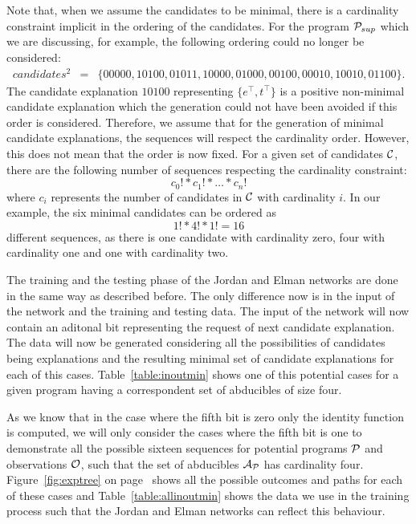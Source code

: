 Note that, when we assume the candidates to be minimal, there is a cardinality constraint implicit in the ordering of the candidates. For the program $\mathcal{P}_{sup}$ which we are discussing, for example, the following ordering could no longer be considered: 
\[
\begin{array}{lcl}
candidates^2 &=& \{00000, 10100, 01011, 10000, 01000, 00100, 00010, 10010, 01100\}.
\end{array}
\]
The candidate explanation $10100$ representing $\{e^\top, t^\top\}$ is a positive non-minimal candidate explanation which the generation could not have been avoided if this order is considered. Therefore, we assume that for the generation of minimal candidate explanations, the sequences will respect the cardinality order. However, this does not mean that the order is now fixed. For a given set of candidates $\mathcal{C}$, there are the following number of sequences respecting the cardinality constraint:
\[
c_0! * c_1! * \dots * c_n!
\]
where $c_i$ represents the number of candidates in $\mathcal{C}$ with cardinality $i$. In our example, the six minimal candidates can be ordered as
\[
1!*4!*1! = 16
\]
different sequences, as there is one candidate with cardinality zero, four with cardinality one and one with cardinality two.

The training and the testing phase of the Jordan and Elman networks are done in the same way as described before. The only difference now is in the input of the network and the training and testing data. The input of the network will now contain an aditonal bit representing the request of next candidate explanation. The data will now be generated considering all the possibilities of candidates being explanations and the resulting minimal set of candidate explanations for each of this cases. Table~\ref{table:inoutmin} shows one of this potential cases for a given program having a correspondent set of abducibles of size four.

As we know that in the case where the fifth bit is zero only the identity function is computed, we will only consider the cases where the fifth bit is one to demonstrate all the possible sixteen sequences for potential programs $\mathcal{P}$ and observations $\mathcal{O}$, such that the set of abducibles $\mathcal{A}_{\mathcal{P}}$ has cardinality four. Figure~\ref{fig:exptree} on page~\pageref{fig:exptree} shows all the possible outcomes and paths for each of these cases and Table~\ref{table:allinoutmin} shows the data we use in the training process such that the Jordan and Elman networks can reflect this behaviour.


